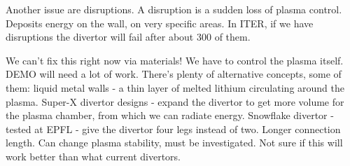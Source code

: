 \documentclass[PlasmaNotes.tex]{subfiles}
\begin{document}
Another issue are disruptions. A disruption is a sudden loss of plasma control. Deposits energy on the wall, on very specific areas. In ITER, if we have disruptions the divertor will fail after about 300 of them.

We can't fix this right now via materials! We have to control the plasma itself. DEMO will need a lot of work. There's plenty of alternative concepts, some of them: liquid metal walls - a thin layer of melted lithium circulating around the plasma. Super-X divertor designs - expand the divertor to get more volume for the plasma chamber, from which we can radiate energy. Snowflake divertor - tested at EPFL - give the divertor four legs instead of two. Longer connection length. Can change plasma stability, must be investigated. Not sure if this will work better than what current divertors.
\end{document}
